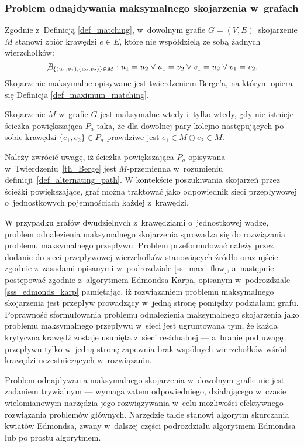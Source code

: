\subsubsection{\textbf{Problem odnajdywania maksymalnego skojarzenia w~grafach}}
\par{
  Zgodnie z~Definicją \ref{def_matching}, w~dowolnym grafie $G=(V,E)$~skojarzenie $M$ stanowi zbiór krawędzi $e \in E$, które nie współdzielą ze sobą żadnych wierzchołków: \[\not\exists_{\{(u_1,v_1), (u_2, v_2)\} \in M}:{u_1 = u_2 \lor u_1 = v_2 \lor v_1 = u_2 \lor v_1 = v_2}.\]
  Skojarzenie maksymalne opisywane jest twierdzeniem Berge'a, na którym opiera się Definicja \ref{def_maximum_matching}.
  \begin{theorem}
    Skojarzenie $M$ w~grafie $G$ jest maksymalne wtedy i~tylko wtedy, gdy nie istnieje ścieżka powiększająca $P_a$ taka, że dla dowolnej pary kolejno następujących po sobie krawędzi $\{e_1, e_2\} \in P_a$ prawdziwe jest $e_1 \in M \oplus e_2 \in M$.
  \end{theorem}
   Należy zwrócić uwagę, iż ścieżka powiększająca $P_a$ opisywana w~Twierdzeniu~\ref{th_Berge} jest $M$-przemienna w~rozumieniu definicji~\ref{def_alternating_path}.
   W kontekście poszukiwania skojarzeń przez ścieżki powiększające, graf można traktować jako odpowiednik sieci przepływowej o~jednostkowych pojemnościach każdej z~krawędzi.
}
\par{
  W przypadku grafów dwudzielnych z~krawędziami o~jednostkowej wadze, problem odnalezienia maksymalnego skojarzenia sprowadza się do rozwiązania problemu maksymalnego przepływu.
  Problem przeformułować należy przez dodanie do sieci przepływowej wierzchołków stanowiących źródło oraz ujście zgodnie z~zasadami opisanymi w~podrozdziale \ref{ss_max_flow}, a~następnie postępować zgodnie z~algorytmem Edmondsa-Karpa, opisanym w~podrozdziale \ref{sss_edmonds_karp} pamiętając, iż rozwiązaniem problemu maksymalnego skojarzenia jest przepływ prowadzący w~jedną stronę pomiędzy podziałami grafu.
  Poprawność sformułowania problemu odnalezienia maksymalnego skojarzenia jako problemu maksymalnego przepływu w~sieci jest ugruntowana tym, że każda krytyczna krawędź zostaje usunięta z~sieci residualnej --- a~branie pod uwagę przepływu tylko w~jedną stronę zapewnia brak wspólnych wierzchołków wśród krawędzi uczestniczących w~rozwiązaniu.
}
\par{
  Problem odnajdywania maksymalnego skojarzenia w~dowolnym grafie nie jest zadaniem trywialnym --- wymaga zatem odpowiedniego, działającego w~czasie wielomianowym narzędzia jego rozwiązywania w~celu możliwości efektywnego rozwiązania problemów głównych.
  Narzędzie takie stanowi algorytm skurczania kwiatów Edmondsa, zwany w~dalszej części podrozdziału algorytmem Edmondsa lub po prostu algorytmem.
}
